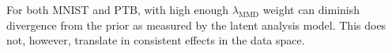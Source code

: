 For both MNIST and PTB, \infovae with high enough $\lambda_{\text{MMD}}$ weight can diminish divergence from the prior as measured by the latent analysis model. This does not, however, translate in consistent effects in the data space.


